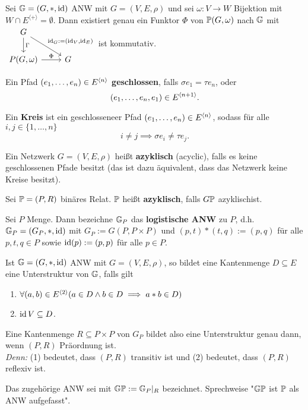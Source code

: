 \begin{bemerkung}
    Sei $\G = (G, \ast, \id)$ ANW mit $G=(V,E,\rho)$ und sei $\omega: V \to W$ Bijektion mit $W \cap E^{\langle + \rangle} = \emptyset$.
    Dann existiert genau ein Funktor $\Phi$ von $\P(G, \omega)$ nach $\G$ mit
    $\begin{tikzcd}
        G \dar{\Gamma} \drar{\id_G:=(\id_V, \id_E)}\\
        P(G,\omega) \rar{\Phi} & G
    \end{tikzcd}$ ist kommutativ.
\end{bemerkung}

\begin{definition}
    Ein Pfad $(e_1,\ldots,e_n) \in E^{\<n\>}$ \textbf{geschlossen}, falls $\sigma e_1 = \tau e_n$, oder
    $$ (e_1,\ldots,e_n, e_1) \in E^{\<n+1\>}.$$
\end{definition}

\begin{definition}
    Ein \textbf{Kreis} ist ein geschlosseneer Pfad $(e_1,\ldots,e_n) \in E^{\<n\>}$, sodass für alle $i,j \in \{1,\ldots,n\}$ 
    $$ i \neq j \implies \sigma e_i \ne \tau e_j .$$
\end{definition}

\begin{definition}
    Ein Netzwerk $G=(V,E,\rho)$ heißt \textbf{azyklisch} (acyclic), falls es keine geschlossenen Pfade besitzt (das ist dazu
    äquivalent, dass das Netzwerk keine Kreise besitzt).
\end{definition}

\begin{definition}
    Sei $\P = (P,R)$ binäres Relat. $\P$ heißt \textbf{azyklisch}, falls $G\P$ azyklischist.
\end{definition}

\begin{erinnerungnr}
    Sei $P$ Menge. Dann bezeichne $\G_P$ das \textbf{logistische ANW} zu $P$, d.h. $\G_P=(G_P, \ast, \id)$
    mit $G_P := G(P, P \times P)$ und $(p,t)\ast(t,q) := (p,q)$ für alle $p,t,q \in P$ sowie 
    $\id(p) := (p,p)$ für alle $p \in P$.

    Ist $\G=(G,\ast, \id)$ ANW mit $G=(V,E,\rho)$, so bildet eine Kantenmenge $D \subseteq E$ eine Unterstruktur
    von $\G$, falls gilt
    \begin{enumerate}[label=(\arabic*)]
        \item $\forall (a,b) \in E^{\<2\>}(a\in D \land b \in D \implies a \ast b \in D)$
        \item $\id V \subseteq D$.
    \end{enumerate}

    Eine Kantenmenge $R \subseteq P \times P$ von $G_P$ bildet also eine Unterstruktur genau dann, wenn
    $(P,R)$ Präordnung ist.\\
    \textit{Denn:} (1) bedeutet, dass $(P,R)$ transitiv ist und (2) bedeutet, dass $(P,R)$ reflexiv ist.

    Das zugehörige ANW sei mit $\G\P := \G_P|_R$ bezeichnet. Sprechweise "$\G\P$ ist $\P$ als ANW aufgefasst".
\end{erinnerungnr}

